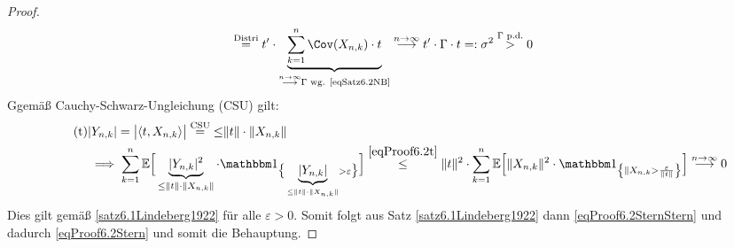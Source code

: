 \begin{proof}
\begin{align*}
&\stackeq{\text{Distri}}
t'\cdot\underbrace{\sum\limits_{k=1}^n\Cov(X_{n,k})\cdot t}_{\stackrel{n\to\infty}{\longrightarrow}\Gamma\text{ wg. \eqref{eqSatz6.2NB}}}\stackrel{n\to\infty}{\longrightarrow} t'\cdot \Gamma\cdot t=:\sigma^2\stackrel{\Gamma\text{ p.d.}}{>}0
\end{align*}
Ggemäß Cauchy-Schwarz-Ungleichung (CSU) gilt:
\begin{align}\label{eqProof6.2t}\tag{t}
&|Y_{n,k}|=\big|\langle t,X_{n,k}\rangle\big|\stackeq{\text{CSU}}{\leq}\Vert t\Vert\cdot\Vert X_{n,k}\Vert\\\nonumber
&\implies\sum\limits_{k=1}^n\E\Big[\underbrace{|Y_{n,k}|^2}_{\leq\Vert t\Vert\cdot\Vert X_{n,k}\Vert}\cdot\indi_{\big\lbrace\underbrace{|Y_{n,k}|}_{\leq\Vert t\Vert\cdot\Vert X_{n,k}\Vert}>\varepsilon\big\rbrace}\Big]
\stackrel{\eqref{eqProof6.2t}}{\leq}
\Vert t\Vert^2\cdot\sum\limits_{k=1}^n\E\Big[\Vert X_{n,k}\Vert^2\cdot\indi_{\left\lbrace\Vert X_{n,k}>\frac{\varepsilon}{\Vert t\Vert}\right\rbrace}\Big]\stackrel{n\to\infty}{\longrightarrow}0
\end{align}
Dies gilt gemäß \ref{satz6.1Lindeberg1922} für alle $\varepsilon>0$. Somit folgt aus Satz \ref{satz6.1Lindeberg1922} dann \eqref{eqProof6.2SternStern} und dadurch \eqref{eqProof6.2Stern} und somit die Behauptung.
\end{proof}

